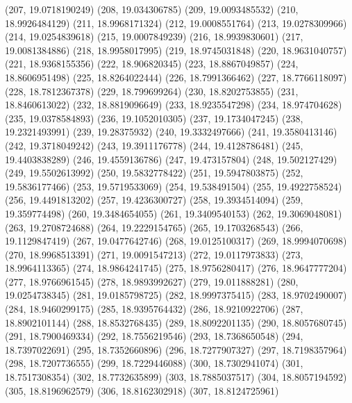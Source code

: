 {					(207, 19.0718190249)
					(208, 19.034306785)
					(209, 19.0093485532)
					(210, 18.9926484129)
					(211, 18.9968171324)
					(212, 19.0008551764)
					(213, 19.0278309966)
					(214, 19.0254839618)
					(215, 19.0007849239)
					(216, 18.9939830601)
					(217, 19.0081384886)
					(218, 18.9958017995)
					(219, 18.9745031848)
					(220, 18.9631040757)
					(221, 18.9368155356)
					(222, 18.906820345)
					(223, 18.8867049857)
					(224, 18.8606951498)
					(225, 18.8264022444)
					(226, 18.7991366462)
					(227, 18.7766118097)
					(228, 18.7812367378)
					(229, 18.799699264)
					(230, 18.8202753855)
					(231, 18.8460613022)
					(232, 18.8819096649)
					(233, 18.9235547298)
					(234, 18.974704628)
					(235, 19.0378584893)
					(236, 19.1052010305)
					(237, 19.1734047245)
					(238, 19.2321493991)
					(239, 19.28375932)
					(240, 19.3332497666)
					(241, 19.3580413146)
					(242, 19.3718049242)
					(243, 19.3911176778)
					(244, 19.4128786481)
					(245, 19.4403838289)
					(246, 19.4559136786)
					(247, 19.473157804)
					(248, 19.502127429)
					(249, 19.5502613992)
					(250, 19.5832778422)
					(251, 19.5947803875)
					(252, 19.5836177466)
					(253, 19.5719533069)
					(254, 19.538491504)
					(255, 19.4922758524)
					(256, 19.4491813202)
					(257, 19.4236300727)
					(258, 19.3934514094)
					(259, 19.359774498)
					(260, 19.3484654055)
					(261, 19.3409540153)
					(262, 19.3069048081)
					(263, 19.2708724688)
					(264, 19.2229154765)
					(265, 19.1703268543)
					(266, 19.1129847419)
					(267, 19.0477642746)
					(268, 19.0125100317)
					(269, 18.9994070698)
					(270, 18.9968513391)
					(271, 19.0091547213)
					(272, 19.0117973833)
					(273, 18.9964113365)
					(274, 18.9864241745)
					(275, 18.9756280417)
					(276, 18.9647777204)
					(277, 18.9766961545)
					(278, 18.9893992627)
					(279, 19.011888281)
					(280, 19.0254738345)
					(281, 19.0185798725)
					(282, 18.9997375415)
					(283, 18.9702490007)
					(284, 18.9460299175)
					(285, 18.9395764432)
					(286, 18.9210922706)
					(287, 18.8902101144)
					(288, 18.8532768435)
					(289, 18.8092201135)
					(290, 18.8057680745)
					(291, 18.7900469334)
					(292, 18.7556219546)
					(293, 18.7368650548)
					(294, 18.7397022691)
					(295, 18.7352660896)
					(296, 18.7277907327)
					(297, 18.7198357964)
					(298, 18.7207736555)
					(299, 18.7229446088)
					(300, 18.7302941074)
					(301, 18.7517308354)
					(302, 18.7732635899)
					(303, 18.7885037517)
					(304, 18.8057194592)
					(305, 18.8196962579)
					(306, 18.8162302918)
					(307, 18.8124725961)
}
